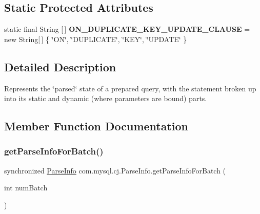 \subsection*{Static Protected Attributes}
\begin{DoxyCompactItemize}
\item 
\mbox{\label{classcom_1_1mysql_1_1cj_1_1_parse_info_ac230b0079c1485cf8af348a2b45fe3ae}} 
static final String \mbox{[}$\,$\mbox{]} {\bfseries O\+N\+\_\+\+D\+U\+P\+L\+I\+C\+A\+T\+E\+\_\+\+K\+E\+Y\+\_\+\+U\+P\+D\+A\+T\+E\+\_\+\+C\+L\+A\+U\+SE} = new String\mbox{[}$\,$\mbox{]} \{ \char`\"{}ON\char`\"{}, \char`\"{}D\+U\+P\+L\+I\+C\+A\+TE\char`\"{}, \char`\"{}K\+EY\char`\"{}, \char`\"{}U\+P\+D\+A\+TE\char`\"{} \}
\end{DoxyCompactItemize}


\subsection{Detailed Description}
Represents the \char`\"{}parsed\char`\"{} state of a prepared query, with the statement broken up into its static and dynamic (where parameters are bound) parts. 

\subsection{Member Function Documentation}
\mbox{\label{classcom_1_1mysql_1_1cj_1_1_parse_info_afb6755fef767af487192ea4a4f589d24}} 
\subsubsection{\texorpdfstring{get\+Parse\+Info\+For\+Batch()}{getParseInfoForBatch()}}
{\footnotesize\ttfamily synchronized \mbox{\hyperlink{classcom_1_1mysql_1_1cj_1_1_parse_info}{Parse\+Info}} com.\+mysql.\+cj.\+Parse\+Info.\+get\+Parse\+Info\+For\+Batch (\begin{DoxyParamCaption}\item[{int}]{num\+Batch }\end{DoxyParamCaption})}

